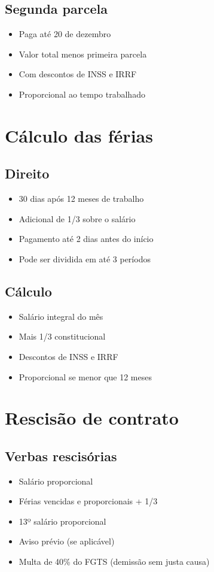\documentclass[12pt,a4paper]{article}
\begin{document}
\subsection{Segunda parcela}
\begin{itemize}
    \item Paga até 20 de dezembro
    \item Valor total menos primeira parcela
    \item Com descontos de INSS e IRRF
    \item Proporcional ao tempo trabalhado
\end{itemize}

\section{Cálculo das férias}

\subsection{Direito}
\begin{itemize}
    \item 30 dias após 12 meses de trabalho
    \item Adicional de 1/3 sobre o salário
    \item Pagamento até 2 dias antes do início
    \item Pode ser dividida em até 3 períodos
\end{itemize}

\subsection{Cálculo}
\begin{itemize}
    \item Salário integral do mês
    \item Mais 1/3 constitucional
    \item Descontos de INSS e IRRF
    \item Proporcional se menor que 12 meses
\end{itemize}

\section{Rescisão de contrato}

\subsection{Verbas rescisórias}
\begin{itemize}
    \item Salário proporcional
    \item Férias vencidas e proporcionais + 1/3
    \item 13º salário proporcional
    \item Aviso prévio (se aplicável)
    \item Multa de 40\% do FGTS (demissão sem justa causa)
\end{itemize}
\end{document}
